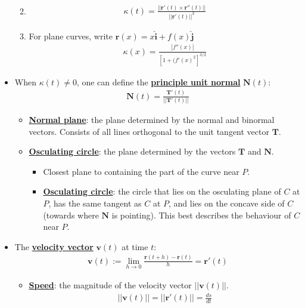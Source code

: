 \documentclass[11pt]{article}
\newcommand{\dfn}[1]{\underline{\textbf{#1}}}
\begin{document}
\begin{itemize}[noitemsep]
\begin{enumerate}[noitemsep]
\begin{align}
		\end{align}
		\item 
		\begin{align}
			\kappa (t) = \frac{|| \mathbf{r}'(t) \times \mathbf{r}''(t) ||}{|| \mathbf{r}'(t) ||^3}
		\end{align}
		\item For plane curves, write $\mathbf{r}(x) = x \mathbf{\hat{i}} + f(x) \mathbf{\hat{j}}$ 
		\begin{align}
				\kappa (x) = \frac{|f''(x)|}{[1+ (f'(x)^2]^{3/2} }
		\end{align}
	\end{enumerate}
	\item When $\kappa(t) \neq 0$, one can define the \dfn{principle unit normal} $\mathbf{N}(t)$: 
	\begin{align}
		\mathbf{N}(t) = \frac{\mathbf{T}'(t)}{|| \mathbf{T}'(t) ||}	
	\end{align}
	\begin{itemize}
		\item \dfn{Normal plane}: the plane determined by the normal and binormal vectors. Consists of all lines orthogonal to the unit tangent vector $\mathbf{T}$. 
		\item \dfn{Osculating circle}: the plane determined by the vectors $\mathbf{T}$ and $\mathbf{N}$. 
		\begin{itemize}
			\item Closest plane to containing the part of the curve near $P$. 
			\item \dfn{Osculating circle}: the circle that lies on the osculating plane of $C$ at $P$, has the same tangent as $C$ at $P$, and lies on the concave side of $C$ (towards where $\mathbf{N}$ is pointing). This best describes the behaviour of $C$ near $P$. 
		\end{itemize}
	\end{itemize}
	\item The \dfn{velocity vector} $\mathbf{v}(t)$ at time $t$: 
	\begin{align}
		\mathbf{v}(t) := \lim_{h \rightarrow 0} \frac{\mathbf{r}(t+h) - \mathbf{r}(t)}{h} = \mathbf{r}'(t) 	
	\end{align}
	\begin{itemize}
		\item \dfn{Speed}: the magnitude of the velocity vector $|| \mathbf{v}(t) ||$. 
		\begin{align}
			|| \mathbf{v}(t) || = || \mathbf{r}'(t) || = \frac{ds}{dt}	
		\end{align}

\end{itemize}
\end{itemize}
\end{document}
